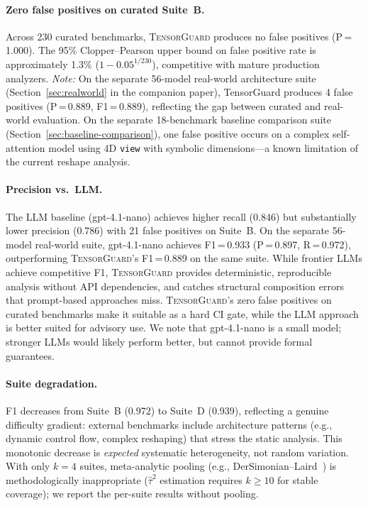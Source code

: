 \documentclass[11pt]{article}
\begin{document}
\paragraph{Zero false positives on curated Suite~B.}
Across 230 curated benchmarks, \textsc{TensorGuard} produces no false
positives (P\,=\,1.000).  The 95\% Clopper--Pearson upper bound
on false positive rate is approximately 1.3\% ($1 - 0.05^{1/230}$), competitive with
mature production analyzers.  \emph{Note:} On the separate 56-model
real-world architecture suite (Section~\ref{sec:realworld} in the
companion paper), TensorGuard produces 4 false positives
(P\,=\,0.889, F1\,=\,0.889), reflecting the gap between curated
and real-world evaluation.
On the separate 18-benchmark baseline comparison suite
(Section~\ref{sec:baseline-comparison}), one false positive occurs on
a complex self-attention model using 4D \texttt{view} with symbolic
dimensions---a known limitation of the current reshape analysis.

\paragraph{Precision vs.\ LLM.}
The LLM baseline (gpt-4.1-nano) achieves higher recall (0.846)
but substantially lower precision (0.786) with 21 false positives
on Suite~B.  On the separate 56-model real-world suite, gpt-4.1-nano
achieves F1\,=\,0.933 (P\,=\,0.897, R\,=\,0.972), outperforming
\textsc{TensorGuard}'s F1\,=\,0.889 on the same suite.  While
frontier LLMs achieve competitive F1, \textsc{TensorGuard}
provides deterministic, reproducible analysis without API
dependencies, and catches structural composition errors that
prompt-based approaches miss.
\textsc{TensorGuard}'s zero false positives on curated benchmarks make it suitable as a
hard CI gate, while the LLM approach is better suited for advisory
use.  We note that gpt-4.1-nano is a small model; stronger LLMs
would likely perform better, but cannot provide formal guarantees.

\paragraph{Suite degradation.}
F1 decreases from Suite~B (0.972) to Suite~D (0.939), reflecting
a genuine difficulty gradient: external benchmarks include architecture
patterns (e.g., dynamic control flow, complex reshaping) that
stress the static analysis.  This monotonic decrease is \emph{expected}
systematic heterogeneity, not random variation.
With only $k=4$ suites, meta-analytic pooling (e.g.,
DerSimonian--Laird~\cite{dersimonian86}) is
methodologically inappropriate ($\hat{\tau}^2$ estimation requires
$k \geq 10$ for stable coverage); we report the per-suite results
without pooling.
\end{document}
